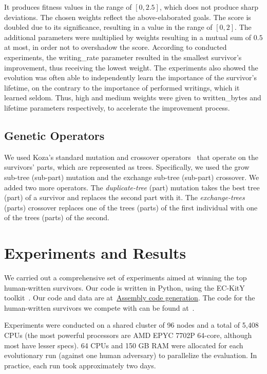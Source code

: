 \documentclass[dvipsnames, format=sigconf]{acmart}
\begin{document}
It produces fitness values in the range of $[0, 2.5]$, which does not produce sharp deviations.
The chosen weights reflect the above-elaborated goals. The score is doubled due to its significance, resulting in a value in the range of $[0, 2]$. The additional parameters were multiplied by weights resulting in a mutual sum of $0.5$ at most, in order not to overshadow the score. According to conducted experiments, the writing\_rate parameter resulted in the smallest survivor's improvement, thus receiving the lowest weight. The experiments also showed the evolution was often able to independently learn the importance of the survivor's lifetime, on the contrary to the importance of performed writings, which it learned seldom. Thus, high and medium weights were given to written\_bytes and lifetime parameters respectively, to accelerate the improvement process.

\subsection{Genetic Operators}
\label{sec:method:operators}
We used Koza's standard mutation and crossover operators~\cite{koza1994genetic} that operate on the survivors' parts, which are represented as trees.
Specifically, we used the grow sub-tree (\ie sub-part) mutation and the exchange sub-tree (sub-part) crossover.
We added two more operators. The \textit{duplicate-tree} (part) mutation takes the best tree (part) of a survivor and replaces the second part with it. The \textit{exchange-trees} (parts) crossover replaces one of the trees (parts) of the first individual with one of the trees (parts) of the second.

\section{Experiments and Results}
\label{sec:results}
We carried out a comprehensive set of experiments aimed at winning the top human-written survivors. Our code is written in Python, using the EC-KitY toolkit~\cite{Sipper2023ECKity}. Our code and data are at~\href{https://github.com/irenamal/EC-KitY/tree/assembly_code_generation}{Assembly code generation}. 
The code for the human-written survivors we compete with can be found at~\cite{codeguru_repo}.

Experiments were conducted on a shared cluster of 96 nodes and a total of 5,408 CPUs (the most powerful processors are AMD EPYC 7702P 64-core, although most have lesser specs). 64 CPUs and 150 GB RAM were allocated for each evolutionary run (against one human adversary) to parallelize the evaluation. In practice, each run took approximately two days. 
\end{document}
